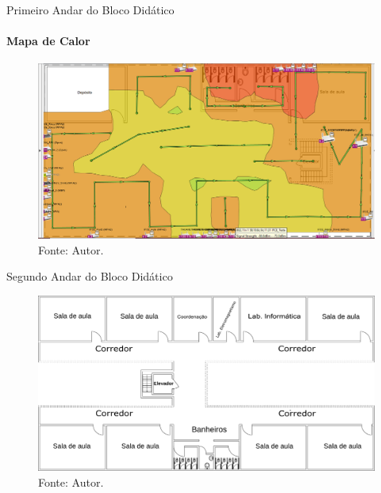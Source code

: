 \documentclass[aspectratio=169,12pt]{beamer}
\begin{document}
\begin{frame}{Primeiro Andar do Bloco Didático}
	\framesubtitle{Mapa de Calor}
	\vspace*{-3mm}
	\begin{figure}[H]
		\centering
		\caption*{{\fontsize{9pt}{11}\selectfont Mapa de calor do 1º andar.}}
		\includegraphics[scale=0.28]{fig_tcc/heatmapper_Terreo_Editada.png}
		\caption*{{\fontsize{8pt}{11}\selectfont Fonte: Autor.}}
	\end{figure}
\end{frame}
\begin{frame}{Segundo Andar do Bloco Didático}
	\vspace*{-3mm}
	\begin{figure}[H]
		\centering
		\caption*{{\fontsize{9pt}{11}\selectfont Planta Baixa do 2º andar.}}
		\includegraphics[scale=0.135]{fig_tcc/planta_andar2.pdf}
		\caption*{{\fontsize{9pt}{11}\selectfont Fonte: Autor.}}
	\end{figure}
\end{frame}
\end{document}
